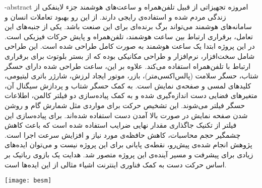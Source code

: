 
\fa-abstract{
امروزه تجهیزاتی از قبیل تلفن‌همراه و ساعت‌های هوشمند جزء لاینفکی از زندگی مردم شده و استفاده‌ی رایجی دارند. از این رو بهبود تعاملات انسان و سامانه‌های هوشمند می‌تواند برگ برنده‌ای برای این صنعت باشد. یکی از جنبه‌های این تعامل، برقراری ارتباط بین ساعت هوشمند، تلفن‌همراه و پایش حرکات فیزیکی است. در این پروژه ابتدا یک ساعت هوشمند به صورت کامل طراحی شده است. این طراحی شامل سخت‌افزار، نرم‌افزار و طراحی مکانیکی بوده که از بستر بلوتوث برای برقراری ارتباط با تلفن‌همراه استفاده می‌کند. علاوه بر این، ساعت طراحی شده دارای حسگر شتاب،‌ حسگر سلامت (پالس‌اکسی‌متر)، بازر، موتور ایجاد لرزش، شارژر باتری لیتیومی، کلیدهای لمسی و صفحه‌ی نمایش است. به کمک حسگر شتاب و پردازش سیگنال آن، متغیرهای فضایی دست اندازه‌گیری شده و به کمک پیاده‌سازی دو فیلتر کالمن، اطلاعات حسگر فیلتر می‌شوند. این تشخیص حرکت برای مواردی مثل شمارش گام و روشن شدن صفحه نمایش در صورت بالا آمدن دست استفاده شده‌اند. برای پیاده‌سازی این فیلتر از تکنیک جاگذاری مقدار نهایی ضرایب استفاده شده است که باعث کاهش چشمگیر حجم محاسبات، کاهش حافظه‌ی مورد نیاز و افزایش سرعت اجرا است. پژوهش انجام شده‌ی پیش‌رو، نقطه‌ی پایانی برای این پروژه نیست و می‌توان ایده‌های زیادی برای پیشرفت و مسیر آینده‌ی این پروژه متصور شد. هدایت یک بازوی رباتیک بر اساس حرکت دست به کمک فناوری اینترنت اشیاء مثالی از این ایده‌ها است.
}





\AUTtitle
\vspace*{7cm}
\thispagestyle{empty}
\begin{center}
\texttt{[image: besm]}
\end{center}